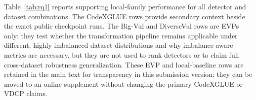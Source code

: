 \documentclass[a4paper,fleqn]{cas-dc}
\begin{document}
\begin{table}[t]
  \centering
  \caption{Per-transformation harmful and beneficial flips.}
  \label{tab:public-flip-taxonomy-transform}
\end{table}

Table~\ref{tab:rq1} reports supporting local-family performance for all
detector and dataset combinations. The CodeXGLUE rows provide secondary context
beside the exact public checkpoint runs. The Big-Vul and DiverseVul rows are
EVPs only: they test whether the transformation pipeline
remains applicable under different, highly imbalanced dataset distributions
and why imbalance-aware metrics are necessary, but they are not used to rank
detectors or to claim full cross-dataset robustness generalization. These EVP
and local-baseline rows are retained in the main text for transparency in this
submission version; they can be moved to an online supplement without changing
the primary CodeXGLUE or VDCP claims.
\end{document}
